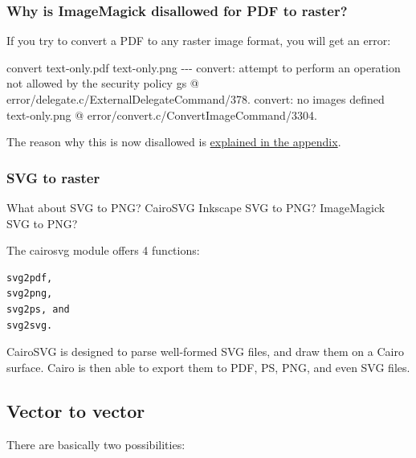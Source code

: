 \documentclass[
  11pt,
  british,
  a4paper,
]{article}
\newenvironment{Shaded}{\begin{snugshade}}{\end{snugshade}}
\newcommand{\ExtensionTok}[1]{\textcolor[rgb]{0.80,0.80,0.80}{#1}}
\newcommand{\KeywordTok}[1]{\textcolor[rgb]{0.94,0.87,0.69}{#1}}
\newcommand{\NormalTok}[1]{\textcolor[rgb]{0.80,0.80,0.80}{#1}}
\newcommand{\StringTok}[1]{\textcolor[rgb]{0.80,0.58,0.58}{#1}}
\begin{document}
\hypertarget{why-is-imagemagick-disallowed-for-pdf-to-raster}{%
\subsubsection{Why is ImageMagick disallowed for PDF to
raster?}\label{why-is-imagemagick-disallowed-for-pdf-to-raster}}

If you try to convert a PDF to any raster image format, you will get an
error:

\begin{Shaded}
\begin{Highlighting}[]
\ExtensionTok{convert}\NormalTok{ text{-}only.pdf text{-}only.png}
\ExtensionTok{{-}{-}{-}}
\ExtensionTok{convert:}\NormalTok{ attempt to perform an operation not allowed by the security policy }\KeywordTok{\textasciigrave{}}\ExtensionTok{gs}\StringTok{\textquotesingle{} @ error/delegate.c/ExternalDelegateCommand/378.}
\StringTok{convert: no images defined \textasciigrave{}text{-}only.png\textquotesingle{}}\NormalTok{ @ error/convert.c/ConvertImageCommand/3304.}
\end{Highlighting}
\end{Shaded}

The reason why this is now disallowed is
\protect\hyperlink{appendix-imagemagicks-security-vulnerabilities}{explained
in the appendix}.

\hypertarget{svg-to-raster}{%
\subsubsection{SVG to raster}\label{svg-to-raster}}

What about SVG to PNG? CairoSVG Inkscape SVG to PNG? ImageMagick SVG to
PNG?

The cairosvg module offers 4 functions:

\begin{verbatim}
svg2pdf,
svg2png,
svg2ps, and
svg2svg.
\end{verbatim}

CairoSVG is designed to parse well-formed SVG files, and draw them on a
Cairo surface. Cairo is then able to export them to PDF, PS, PNG, and
even SVG files.

\hypertarget{vector-to-vector}{%
\subsection{Vector to vector}\label{vector-to-vector}}

There are basically two possibilities:
\end{document}
